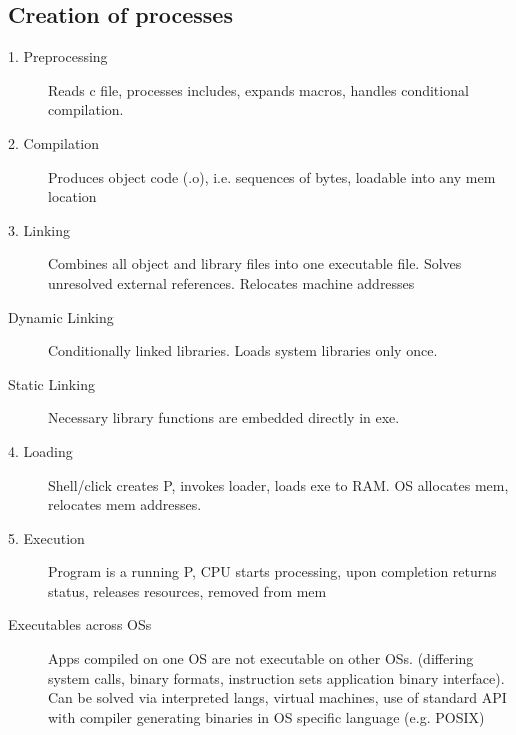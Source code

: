 \subsection*{Creation of processes}
\begin{description}
  \item[1. Preprocessing] Reads c file, processes includes, expands macros, handles conditional compilation.
  \item[2. Compilation] Produces object code (.o), i.e. sequences of bytes, loadable into any mem location
  \item[3. Linking] Combines all object and library files into one executable file. Solves unresolved external references. Relocates machine addresses
  \item[Dynamic Linking] Conditionally linked libraries. Loads system libraries only once.
  \item[Static Linking] Necessary library functions are embedded directly in exe.
  \item[4. Loading] Shell/click creates P, invokes loader, loads exe to RAM. OS allocates mem, relocates mem addresses.
  \item[5. Execution] Program is a running P, CPU starts processing, upon completion returns status, releases resources, removed from mem



  \item[Executables across OSs] Apps compiled on one OS are not executable on other OSs. (differing system calls, binary formats, instruction sets application binary interface). Can be solved via interpreted langs, virtual machines, use of standard API with compiler generating binaries in OS specific language (e.g. POSIX)

\end{description}

